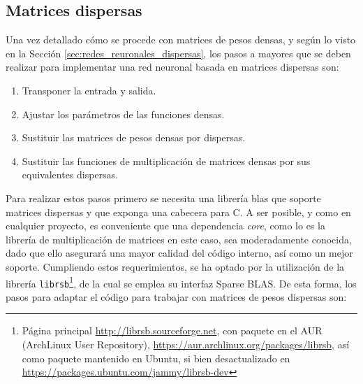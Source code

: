 \subsection{Matrices dispersas}
\label{ssec:gdin_matrices_dispersas}
Una vez detallado cómo se procede con matrices de pesos densas, y según lo visto en la Sección \ref{sec:redes_reuronales_dispersas}, los pasos a mayores que se deben realizar para implementar una red neuronal basada en matrices dispersas son:

\begin{enumerate}
    \item Transponer la entrada y salida.
    \item Ajustar los parámetros de las funciones densas.
    \item Sustituir las matrices de pesos densas por dispersas.
    \item Sustituir las funciones de multiplicación de matrices densas por sus equivalentes dispersas.
\end{enumerate}

Para realizar estos pasos primero se necesita una librería \acrshort{blas} que soporte matrices dispersas y que exponga una cabecera para C. A ser posible, y como en cualquier proyecto, es conveniente que una dependencia \textit{core}, como lo es la librería de multiplicación de matrices en este caso, sea moderadamente conocida, dado que ello asegurará una mayor calidad del código interno, así como un mejor soporte. Cumpliendo estos requerimientos, se ha optado por la utilización de la librería \texttt{librsb}\footnote{Página principal \url{http://librsb.sourceforge.net}, con paquete en el AUR (ArchLinux User Repository), \url{https://aur.archlinux.org/packages/librsb}, así como paquete mantenido en Ubuntu, si bien desactualizado en \url{https://packages.ubuntu.com/jammy/librsb-dev}}, de la cual se emplea su interfaz Sparse BLAS. De esta forma, los pasos para adaptar el código para trabajar con matrices de pesos dispersas son:


